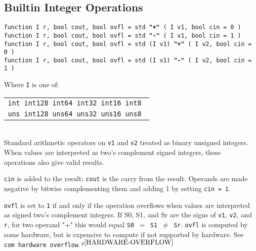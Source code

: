 \documentclass[12pt]{article}
\newcommand{\ttkey}[1]{{\tt \bfseries #1}}
\newcommand{\pagnote}[1]{$\,^{p\pageref{#1}}$}
\newenvironment{indpar}[1][0.3in]%
	{\begin{list}{}%
		     {\setlength{\itemsep}{0in}%
		      \setlength{\topsep}{0in}%
		      \setlength{\parsep}{1ex}%
		      \setlength{\labelwidth}{#1}%
		      \setlength{\leftmargin}{#1}%
		      \addtolength{\leftmargin}{\labelsep}}%
	 \item}%
	{\end{list}}
\begin{document}
\subsection{Builtin Integer Operations}
\label{BUILTIN-INTEGER-OPERATIONS}


{\tt function I r, bool cout, bool ovfl =
	std \ttkey{"+"} ( I v1, bool cin = 0 )} \\
{\tt function I r, bool cout, bool ovfl =
	std \ttkey{"-"} ( I v1, bool cin = 1 )} \\
{\tt function I r, bool cout, bool ovfl =
    std (I v1) \ttkey{"+"} ( I v2, bool cin = 0 )} \\
{\tt function I r, bool cout, bool ovfl =
    std (I v1) \ttkey{"-"} ( I v2, bool cin = 1 )}
\begin{indpar}
Where {\tt I} is one of:
	\begin{tabular}[t]{l}
	\tt int  int128 int64  int32  int16  int8 \\
	\tt uns  int128 uns64  uns32  uns16  uns8 \\
	\end{tabular}
\\[1ex]
Standard arithmetic operators on {\tt v1} and {\tt v2}
treated as binary unsigned integers.  When values are
interpreted as two's complement signed integers, these
operations also give valid results.

{\tt cin} is added to the result; {\tt cout} is the carry from
the result.  Operands are made negative by bitwise complementing
them and adding 1 by setting {\tt cin = 1}.

{\tt ovfl} is set to {\tt 1} if and only if the operation overflows
when values are interpreted as signed two's complement integers.
If S0, S1, and Sr are the signs of {\tt v1}, {\tt v2}, and {\tt r},
for two operand "+" this would equal {\tt S0 $=$ S1 $\neq$ Sr}.
{\tt ovfl} is computed by some hardware, but is expensive to
compute if not supported by hardware.\label{ADD-SUB-OVERFLOW}  See
{\tt com hardware overflow}.\pagnote{HARDWARE-OVERFLOW}

\end{indpar}
\end{document}
